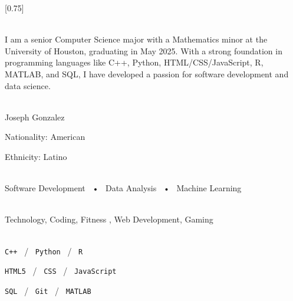 \documentclass[lighthipster]{simplehipstercv}
\begin{document}
\setlength{\columnsep}{1.5cm}
[0.75]
\begin{paracol}{2}

\paracolbackgroundoptions



\footnotesize
{\setasidefontcolour
\flushright
\begin{center}
\end{center}

\\[0.5em]

{\footnotesize
I am a senior Computer Science major with a Mathematics minor at the University of Houston, graduating in May 2025. With a strong foundation in programming languages like C++, Python, HTML/CSS/JavaScript, R, MATLAB, and SQL, I have developed a passion for software development and data science.
}
\bigskip

 \\[0.5em]
Joseph Gonzalez

Nationality: American

Ethnicity: Latino

\bigskip

 \\[0.5em]

Software Development ~•~ Data Analysis ~•~ Machine Learning

\bigskip



\bigskip

\\[0.5em]

Technology, Coding, Fitness , Web Development, Gaming
\bigskip

\\[0.5em]

\texttt{C++} ~/~ \texttt{Python} ~/~ \texttt{R}

\texttt{HTML5} ~/~ \texttt{CSS} ~/~ \texttt{JavaScript}

\texttt{SQL} ~/~ \texttt{Git} ~/~ \texttt{MATLAB}

\vspace{4em}


}
\end{paracol}
\end{document}
